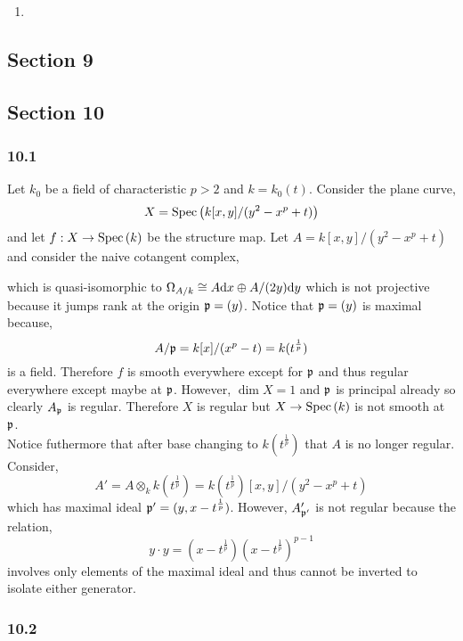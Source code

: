 \documentclass[12pt]{article}
\begin{document}
\begin{enumerate}
\item 
\end{enumerate}

\subsection{Section 9}

\subsection{Section 10}


\subsubsection{10.1}

Let $k_0$ be a field of characteristic $p > 2$ and $k = k_0(t)$. Consider the plane curve,
\[ X = \mathrm{Spec}\left( k[x,y]/(y^2 - x^p + t) \right) \]
and let $f : X \to \mathrm{Spec}\left( k \right)$ be the structure map. Let $A = k[x,y]/(y^2 - x^p + t)$ and consider the naive cotangent complex,
\begin{center}
\end{center}
which is quasi-isomorphic to $\Omega_{A/k} \cong A \mathrm{d}{x} \oplus A/(2y) \mathrm{d}{y}$ which is not projective because it jumps rank at the origin $\mathfrak{p} = (y)$. Notice that $\mathfrak{p} = (y)$ is maximal because,
\[ A/\mathfrak{p} = k[x]/(x^p - t) = k(t^{\frac{1}{p}}) \]
is a field. Therefore $f$ is smooth everywhere except for $\mathfrak{p}$ and thus regular everywhere except maybe at $\mathfrak{p}$. However, $\dim{X} = 1$ and $\mathfrak{p}$ is principal already so clearly $A_{\mathfrak{p}}$ is regular. Therefore $X$ is regular but $X \to \mathrm{Spec}\left( k \right)$ is not smooth at $\mathfrak{p}$. 
\bigskip\\
Notice futhermore that after base changing to $k(t^{\frac{1}{p}})$ that $A$ is no longer regular. Consider,
\[ A' = A \otimes_k k(t^{\frac{1}{p}}) = k(t^{\frac{1}{p}})[x, y]/(y^2 - x^p + t) \]
which has maximal ideal $\mathfrak{p}' = (y, x - t^{\frac{1}{p}})$. However, $A'_{\mathfrak{p}'}$ is not regular because the relation,
\[ y \cdot y = (x - t^{\frac{1}{p}})(x - t^{\frac{1}{p}})^{p - 1} \]
involves only elements of the maximal ideal and thus cannot be inverted to isolate either generator.

\subsubsection{10.2}
\end{document}
